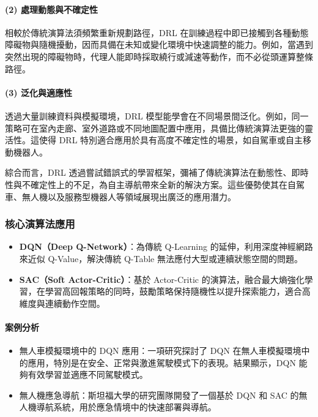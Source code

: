 \documentclass[12pt,a4paper]{article}
\begin{document}
\paragraph{(2) 處理動態與不確定性}
相較於傳統演算法須頻繁重新規劃路徑，DRL 在訓練過程中即已接觸到各種動態障礙物與隨機擾動，因而具備在未知或變化環境中快速調整的能力。例如，當遇到突然出現的障礙物時，代理人能即時採取繞行或減速等動作，而不必從頭運算整條路徑\cite{DRLAutonomous}\cite{PathPlanningMethod}。

\paragraph{(3) 泛化與適應性}
透過大量訓練資料與模擬環境，DRL 模型能學會在不同場景間泛化。例如，同一策略可在室內走廊、室外道路或不同地圖配置中應用，具備比傳統演算法更強的靈活性。這使得 DRL 特別適合應用於具有高度不確定性的場景，如自駕車或自主移動機器人\cite{DRLAutonomous}。
\\ \par
綜合而言，DRL 透過嘗試錯誤式的學習框架，彌補了傳統演算法在動態性、即時性與不確定性上的不足，為自主導航帶來全新的解決方案。這些優勢使其在自駕車、無人機以及服務型機器人等領域展現出廣泛的應用潛力。

\subsubsection{核心演算法應用}
\begin{itemize}
  \item \textbf{DQN（Deep Q-Network）}：為傳統 Q-Learning 的延伸，利用深度神經網路來近似 Q-Value，解決傳統 Q-Table 無法應付大型或連續狀態空間的問題\cite{DQN}。
  \item \textbf{SAC（Soft Actor-Critic）}：基於 Actor-Critic 的演算法，融合最大熵強化學習，在學習高回報策略的同時，鼓勵策略保持隨機性以提升探索能力，適合高維度與連續動作空間\cite{Atari}\cite{SAC}。
\end{itemize}

\paragraph{案例分析}
\begin{itemize}
  \item 無人車模擬環境中的 DQN 應用：一項研究探討了 DQN 在無人車模擬環境中的應用，特別是在安全、正常與激進駕駛模式下的表現。結果顯示，DQN 能夠有效學習並適應不同駕駛模式\cite{rybchak2024}。
  \item 無人機應急導航：斯坦福大學的研究團隊開發了一個基於 DQN 和 SAC 的無人機導航系統，用於應急情境中的快速部署與導航\cite{greenberg}。
\end{itemize}
\end{document}
